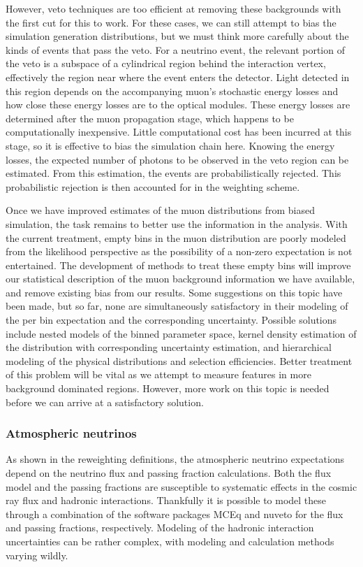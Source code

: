 However, veto techniques are too efficient at removing these backgrounds with the first cut for this to work.
For these cases, we can still attempt to bias the simulation generation distributions, but we must think more carefully about the kinds of events that pass the veto.
For a neutrino event, the relevant portion of the veto is a subspace of a cylindrical region behind the interaction vertex, effectively the region near where the event enters the detector.
Light detected in this region depends on the accompanying muon's stochastic energy losses and how close these energy losses are to the optical modules.
These energy losses are determined after the muon propagation stage, which happens to be computationally inexpensive.
Little computational cost has been incurred at this stage, so it is effective to bias the simulation chain here.
Knowing the energy losses, the expected number of photons to be observed in the veto region can be estimated.
From this estimation, the events are probabilistically rejected.
This probabilistic rejection is then accounted for in the weighting scheme.

Once we have improved estimates of the muon distributions from biased simulation, the task remains to better use the information in the analysis.
With the current treatment, empty bins in the muon distribution are poorly modeled from the likelihood perspective as the possibility of a non-zero expectation is not entertained.
The development of methods to treat these empty bins will improve our statistical description of the muon background information we have available, and remove existing bias from our results.
Some suggestions on this topic have been made, but so far, none are simultaneously satisfactory in their modeling of the per bin expectation and the corresponding uncertainty.
Possible solutions include nested models of the binned parameter space, kernel density estimation of the distribution with corresponding uncertainty estimation, and hierarchical modeling of the physical distributions and selection efficiencies.
Better treatment of this problem will be vital as we attempt to measure features in more background dominated regions.
However, more work on this topic is needed before we can arrive at a satisfactory solution.

\subsubsection{Atmospheric neutrinos}
As shown in the reweighting definitions, the atmospheric neutrino expectations depend on the neutrino flux and passing fraction calculations.
Both the flux model and the passing fractions are susceptible to systematic effects in the cosmic ray flux and hadronic interactions.
Thankfully it is possible to model these through a combination of the software packages MCEq and nuveto for the flux and passing fractions, respectively.
Modeling of the hadronic interaction uncertainties can be rather complex, with modeling and calculation methods varying wildly.

